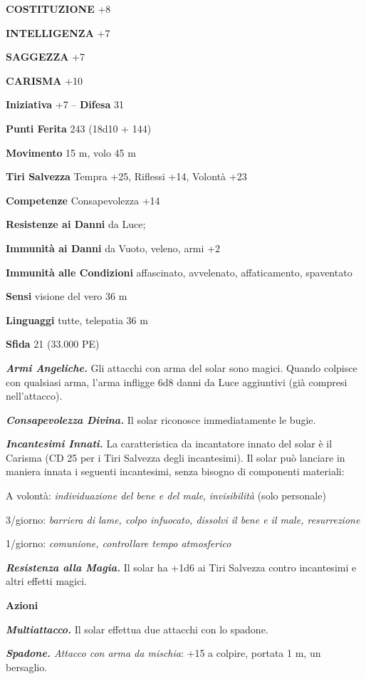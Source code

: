 \begin{multicols}{2}
\textbf{COSTITUZIONE} +8

\textbf{INTELLIGENZA} +7

\textbf{SAGGEZZA} +7

\textbf{CARISMA} +10

\textbf{Iniziativa} +7 -- \textbf{Difesa} 31

\textbf{Punti Ferita} 243 (18d10 + 144) 

\textbf{Movimento} 15 m, volo 45 m

\textbf{Tiri Salvezza} Tempra +25, Riflessi +14, Volontà +23

\textbf{Competenze} Consapevolezza +14

\textbf{Resistenze ai Danni} da Luce;

\textbf{Immunità ai Danni} da Vuoto, veleno, armi +2

\textbf{Immunità alle Condizioni} affascinato, avvelenato, affaticamento, spaventato

\textbf{Sensi} visione del vero 36 m

\textbf{Linguaggi} tutte, telepatia 36 m 

\textbf{Sfida} 21 (33.000 PE)

\emph{\textbf{Armi Angeliche.}} Gli attacchi con arma del solar sono magici. Quando colpisce con qualsiasi arma, l'arma infligge 6d8 danni da Luce aggiuntivi (già compresi nell'attacco).

\emph{\textbf{Consapevolezza Divina.}} Il solar riconosce immediatamente le bugie.

\emph{\textbf{Incantesimi Innati.}} La caratteristica da incantatore innato del solar è il Carisma (CD 25 per i Tiri Salvezza degli incantesimi). Il solar può lanciare in maniera innata i seguenti incantesimi, senza bisogno di componenti materiali:

A volontà: \emph{individuazione del bene e del male}, \emph{invisibilità} (solo personale)

3/giorno: \emph{barriera di lame, colpo infuocato, dissolvi il bene e il male, resurrezione}

1/giorno: \emph{comunione, controllare tempo atmosferico}

\emph{\textbf{Resistenza alla Magia.}} Il solar ha +1d6 ai Tiri Salvezza contro incantesimi e altri effetti magici.

\textbf{Azioni}

\emph{\textbf{Multiattacco.}} Il solar effettua due attacchi con lo spadone.

\emph{\textbf{Spadone.} Attacco con arma da mischia}: +15 a colpire, portata 1 m, un bersaglio.


\end{multicols}
